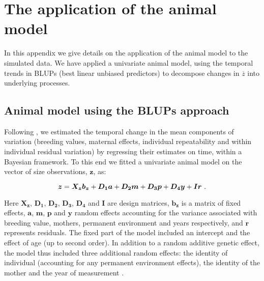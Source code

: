 \section{The application of the animal model} \label{app:am}
In this appendix we give details on the application of the animal model to the simulated data. We have applied a univariate animal model, using the temporal trends in BLUPs (best linear unbiased predictors) to decompose changes in $\overline z$ into underlying processes.

\subsection{Animal model using the BLUPs approach} \label{app:am:blup}
Following \cite{Hadfield2010}, we estimated the temporal change in the mean components of variation (breeding values, maternal effects, individual repeatability and within individual residual variation) by regressing their estimates on time, within a Bayesian framework. 
To this end we fitted a univariate animal model on the vector of size observations, $\boldsymbol{z}$, as:

\begin{equation}
\boldsymbol{z}=\boldsymbol{X_z}\boldsymbol{b_z}+\boldsymbol{D_1a}+\boldsymbol{D_2m}+\boldsymbol{D_3p}+\boldsymbol{D_4y}+\boldsymbol{Ir} \text{ .}\\
\end{equation}

\noindent Here $\boldsymbol{X_z}$, $\boldsymbol{D_1}$, $\boldsymbol{D_2}$, $\boldsymbol{D_3}$, $\boldsymbol{D_4}$ and $\boldsymbol{I}$ are design matrices, $\boldsymbol{b_z}$ is a matrix of fixed effects, $\boldsymbol{a}$, $\boldsymbol{m}$, $\boldsymbol{p}$ and $\boldsymbol{y}$ random effects accounting for the variance associated with breeding value, mothers, permanent environment and years respectively, and $\boldsymbol{r}$ represents residuals. The fixed part of the model included an intercept and the effect of age (up to second order). In addition to a random additive genetic effect, the model thus included three additional random effects: the identity of individual (accounting for any permanent environment effects), the identity of the mother and the year of measurement \citep{Kruuk2004}.

